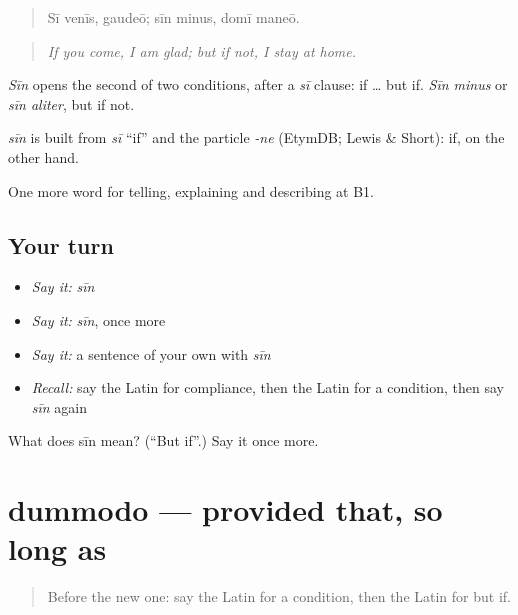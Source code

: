 \begin{quote}
Sī venīs, gaudeō; sīn minus, domī maneō.
\end{quote}

\begin{quote}
\emph{If you come, I am glad; but if not, I stay at home.}
\end{quote}

\emph{Sīn} opens the second of two conditions, after a \emph{sī} clause: if … but if. \emph{Sīn minus} or \emph{sīn aliter}, but if not.

\begin{cousinweb}
\emph{sīn} is built from \emph{sī} \textquotedblleft{}if\textquotedblright{} and the particle \emph{-ne} (EtymDB; Lewis \& Short): if, on the other hand.
\end{cousinweb}

\begin{grammarlens}[title={What you've built}]
One more word for telling, explaining and describing at B1.
\end{grammarlens}

\subsection*{Your turn}
\begin{itemize}
\raggedright
  \item \emph{Say it:} \emph{sīn}
  \item \emph{Say it:} \emph{sīn}, once more
  \item \emph{Say it:} a sentence of your own with \emph{sīn}
  \item \emph{Recall:} say the Latin for compliance, then the Latin for a condition, then say \emph{sīn} again
\end{itemize}

\begin{tcolorbox}[breakable,colback=teal!4,colframe=teal!35!black,title={Before you move on}]
What does sīn mean? (\textquotedblleft{}But if\textquotedblright{}.) Say it once more.
\end{tcolorbox}
\section[dummodo]{dummodo — provided that, so long as}

\label{lesson:LA-C390-dummodo}



\begin{quote}
Before the new one: say the Latin for a condition, then the Latin for but if.
\end{quote}

